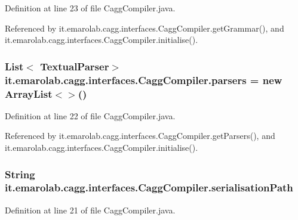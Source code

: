 Definition at line 23 of file Cagg\-Compiler.\-java.



Referenced by it.\-emarolab.\-cagg.\-interfaces.\-Cagg\-Compiler.\-get\-Grammar(), and it.\-emarolab.\-cagg.\-interfaces.\-Cagg\-Compiler.\-initialise().

\hypertarget{classit_1_1emarolab_1_1cagg_1_1interfaces_1_1CaggCompiler_a12b06f200f3c0dd8c0a319a7b7115db9}{
\subsubsection[{parsers}]{\setlength{\rightskip}{0pt plus 5cm}List$<$ {\bf Textual\-Parser}$>$ it.\-emarolab.\-cagg.\-interfaces.\-Cagg\-Compiler.\-parsers = new Array\-List$<$$>$()\hspace{0.3cm}{\ttfamily [private]}}}\label{classit_1_1emarolab_1_1cagg_1_1interfaces_1_1CaggCompiler_a12b06f200f3c0dd8c0a319a7b7115db9}


Definition at line 22 of file Cagg\-Compiler.\-java.



Referenced by it.\-emarolab.\-cagg.\-interfaces.\-Cagg\-Compiler.\-get\-Parsers(), and it.\-emarolab.\-cagg.\-interfaces.\-Cagg\-Compiler.\-initialise().

\hypertarget{classit_1_1emarolab_1_1cagg_1_1interfaces_1_1CaggCompiler_adff370ab0237bd5b87746bb838cee15f}{
\subsubsection[{serialisation\-Path}]{\setlength{\rightskip}{0pt plus 5cm}String it.\-emarolab.\-cagg.\-interfaces.\-Cagg\-Compiler.\-serialisation\-Path\hspace{0.3cm}{\ttfamily [private]}}}\label{classit_1_1emarolab_1_1cagg_1_1interfaces_1_1CaggCompiler_adff370ab0237bd5b87746bb838cee15f}


Definition at line 21 of file Cagg\-Compiler.\-java.



